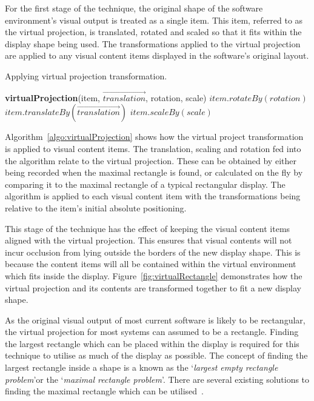 \documentclass[review,5p,times,twocolumn]{elsarticle}
\newcommand{\INDSTATE}[1][1]{\STATE\hspace{#1\algorithmicindent}}
\begin{document}
For the first stage of the technique, the original shape of the software environment's visual output is treated as a single item.
This item, referred to as the virtual projection, is translated, rotated and scaled so that it fits within the display shape being used.
The transformations applied to the virtual projection are applied to any visual content items displayed in the software's original layout.

\begin{algorithm}[h]
\caption{Applying virtual projection transformation.}
\label{algo:virtualProjection}
\begin{algorithmic}
\STATE \textbf{virtualProjection}(item, $\overrightarrow{translation}$, rotation, scale)
\INDSTATE[2]$item.rotateBy(rotation)$
\INDSTATE[2]$item.translateBy(\overrightarrow{translation})$
\INDSTATE[2]$item.scaleBy(scale)$
\end{algorithmic}
\end{algorithm}

Algorithm~\ref{algo:virtualProjection} shows how the virtual project transformation is applied to visual content items.
The translation, scaling and rotation fed into the algorithm relate to the virtual projection.
These can be obtained by either being recorded when the maximal rectangle is found, or calculated on the fly by comparing it to the maximal rectangle of a typical rectangular display.
The algorithm is applied to each visual content item with the transformations being relative to the item's initial absolute positioning.

This stage of the technique has the effect of keeping the visual content items aligned with the virtual projection.
This ensures that visual contents will not incur occlusion from lying outside the borders of the new display shape.
This is because the content items will all be contained within the virtual environment which fits inside the display.
Figure~\ref{fig:virtualRectangle} demonstrates how the virtual projection and its contents are transformed together to fit a new display shape.

As the original visual output of most current software is likely to be rectangular, the virtual projection for most systems can assumed to be a rectangle.
Finding the largest rectangle which can be placed within the display is required for this technique to utilise as much of the display as possible.
The concept of finding the largest rectangle inside a shape is a known as the \lq {\emph{largest empty rectangle problem}}\rq or the \lq {\emph{maximal rectangle problem}}\rq .
There are several existing solutions to finding the maximal rectangle which can be utilised~\cite{Aggarwal1987,Naamad1984}.
\end{document}
